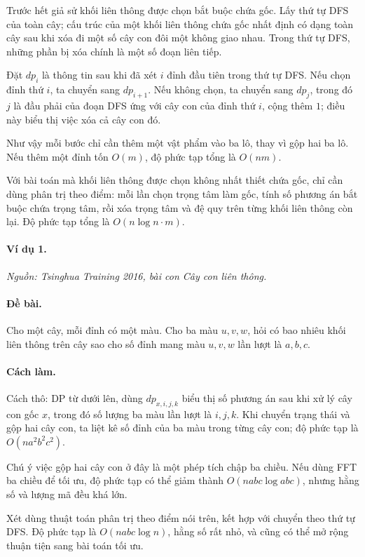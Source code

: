 \documentclass[11pt]{article}
\begin{document}
Trước hết giả sử khối liên thông được chọn bắt buộc chứa gốc. Lấy thứ tự DFS của
toàn cây; cấu trúc của một khối liên thông chứa gốc nhất định có dạng toàn cây
sau khi xóa đi một số cây con đôi một không giao nhau. Trong thứ tự DFS, những
phần bị xóa chính là một số đoạn liên tiếp.

Đặt \(dp_i\) là thông tin sau khi đã xét \(i\) đỉnh đầu tiên trong thứ tự DFS.
Nếu chọn đỉnh thứ \(i\), ta chuyển sang \(dp_{i+1}\). Nếu không chọn, ta chuyển
sang \(dp_j\), trong đó \(j\) là đầu phải của đoạn DFS ứng với cây con của đỉnh
thứ \(i\), cộng thêm \(1\); điều này biểu thị việc xóa cả cây con đó.

Như vậy mỗi bước chỉ cần thêm một vật phẩm vào ba lô, thay vì gộp hai ba lô. Nếu
thêm một đỉnh tốn \(O(m)\), độ phức tạp tổng là \(O(nm)\).

Với bài toán mà khối liên thông được chọn không nhất thiết chứa gốc, chỉ cần
dùng phân trị theo điểm: mỗi lần chọn trọng tâm làm gốc, tính số phương án bắt
buộc chứa trọng tâm, rồi xóa trọng tâm và đệ quy trên từng khối liên thông còn
lại. Độ phức tạp tổng là \(O(n\log n\cdot m)\).

\paragraph{Ví dụ 1.}
\emph{Nguồn: Tsinghua Training 2016, bài con \emph{Cây con liên thông}.}

\paragraph{Đề bài.}
Cho một cây, mỗi đỉnh có một màu. Cho ba màu \(u,v,w\), hỏi có bao nhiêu khối
liên thông trên cây sao cho số đỉnh mang màu \(u,v,w\) lần lượt là \(a,b,c\).

\paragraph{Cách làm.}
Cách thô: DP từ dưới lên, dùng \(dp_{x,i,j,k}\) biểu thị số phương án sau khi xử
lý cây con gốc \(x\), trong đó số lượng ba màu lần lượt là \(i,j,k\). Khi chuyển
trạng thái và gộp hai cây con, ta liệt kê số đỉnh của ba màu trong từng cây con;
độ phức tạp là \(O(na^2b^2c^2)\).

Chú ý việc gộp hai cây con ở đây là một phép tích chập ba chiều. Nếu dùng FFT ba
chiều để tối ưu, độ phức tạp có thể giảm thành \(O(nabc\log abc)\), nhưng hằng
số và lượng mã đều khá lớn.

Xét dùng thuật toán phân trị theo điểm nói trên, kết hợp với chuyển theo thứ tự
DFS. Độ phức tạp là \(O(nabc\log n)\), hằng số rất nhỏ, và cũng có thể mở rộng
thuận tiện sang bài toán tối ưu.
\end{document}
